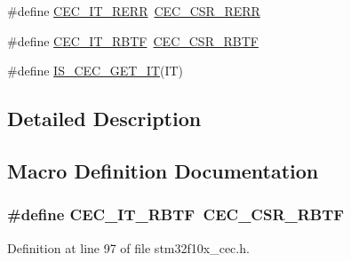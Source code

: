 \begin{DoxyCompactItemize}
\item 
\#define \hyperlink{group___c_e_c__interrupts__definition_gac015ebba728a69eeb84be1bc56a58ac0}{C\+E\+C\+\_\+\+I\+T\+\_\+\+R\+E\+RR}~\hyperlink{group___peripheral___registers___bits___definition_ga2e33f1d4724efa45fce87ae2fcba6cff}{C\+E\+C\+\_\+\+C\+S\+R\+\_\+\+R\+E\+RR}
\item 
\#define \hyperlink{group___c_e_c__interrupts__definition_ga42834131bf077a878e84470ae98f1bb4}{C\+E\+C\+\_\+\+I\+T\+\_\+\+R\+B\+TF}~\hyperlink{group___peripheral___registers___bits___definition_gaa325807f8f3d4bdf8e989eeef208ca5a}{C\+E\+C\+\_\+\+C\+S\+R\+\_\+\+R\+B\+TF}
\item 
\#define \hyperlink{group___c_e_c__interrupts__definition_ga7f553a4a3346c676101d81a024a9cba8}{I\+S\+\_\+\+C\+E\+C\+\_\+\+G\+E\+T\+\_\+\+IT}(IT)
\end{DoxyCompactItemize}


\subsection{Detailed Description}


\subsection{Macro Definition Documentation}
\subsubsection[{\texorpdfstring{C\+E\+C\+\_\+\+I\+T\+\_\+\+R\+B\+TF}{CEC_IT_RBTF}}]{\setlength{\rightskip}{0pt plus 5cm}\#define C\+E\+C\+\_\+\+I\+T\+\_\+\+R\+B\+TF~{\bf C\+E\+C\+\_\+\+C\+S\+R\+\_\+\+R\+B\+TF}}\hypertarget{group___c_e_c__interrupts__definition_ga42834131bf077a878e84470ae98f1bb4}{}\label{group___c_e_c__interrupts__definition_ga42834131bf077a878e84470ae98f1bb4}


Definition at line 97 of file stm32f10x\+\_\+cec.\+h.

